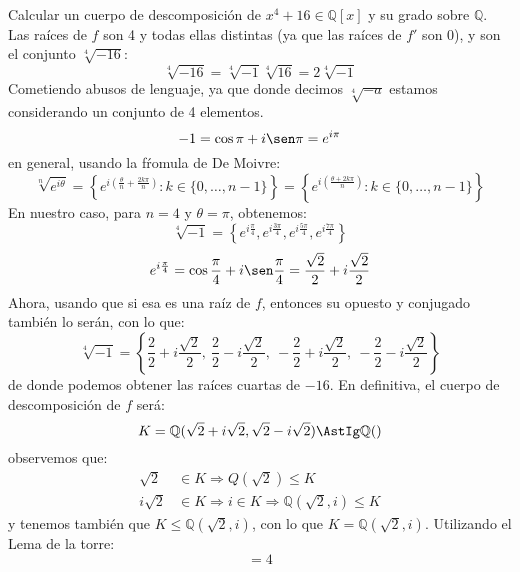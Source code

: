 \begin{ejercicio}
    Calcular un cuerpo de descomposición de $x^4+16\in \mathbb{Q}[x]$ y su grado sobre $\mathbb{Q}$. Las raíces de $f$ son 4 y todas ellas distintas (ya que las raíces de $f'$ son 0), y son el conjunto $\sqrt[4]{-16}$:
    \begin{equation*}
        \sqrt[4]{-16} = \sqrt[4]{-1}\sqrt[4]{16} = 2\sqrt[4]{-1}
    \end{equation*}
    Cometiendo abusos de lenguaje, ya que donde decimos $\sqrt[4]{-a}$ estamos considerando un conjunto de 4 elementos.
    \begin{equation*}
        -1 = \cos\pi + i\sen\pi = e^{i\pi}
    \end{equation*}
    en general, usando la fŕomula de De Moivre:
    \begin{equation*}
        \sqrt[n]{e^{i\theta}} = \left\{e^{i\left(\frac{\theta}{n}+\frac{2k\pi}{n}\right)} : k \in \{0,\ldots,n-1\}\right\} = \left\{e^{i\left(\frac{\theta+2k\pi}{n}\right)} : k \in \{0,\ldots,n-1\}\right\}
    \end{equation*}
    En nuestro caso, para $n=4$ y $\theta = \pi$, obtenemos:
    \begin{equation*}
        \sqrt[4]{-1} = \left\{e^{i\frac{\pi}{4}}, e^{i\frac{3\pi}{4}}, e^{i\frac{5\pi}{4}}, e^{i\frac{7\pi}{4}}\right\}
    \end{equation*}
    \begin{equation*}
        e^{i\frac{\pi}{4}} = \cos\frac{\pi}{4} + i\sen\frac{\pi}{4} = \dfrac{\sqrt{2}}{2}+i\dfrac{\sqrt{2}}{2}
    \end{equation*}
    Ahora, usando que si esa es una raíz de $f$, entonces su opuesto y conjugado también lo serán, con lo que:
    \begin{equation*}
        \sqrt[4]{-1} = \left\{\frac{2}{2}+i\frac{\sqrt{2}}{2},\ \frac{2}{2}-i\frac{\sqrt{2}}{2},\ -\frac{2}{2}+i\frac{\sqrt{2}}{2},\ -\frac{2}{2}-i\frac{\sqrt{2}}{2}\right\}
    \end{equation*}
    de donde podemos obtener las raíces cuartas de $-16$. En definitiva, el cuerpo de descomposición de $f$ será:
    \begin{equation*}
        K = \mathbb{Q}(\sqrt{2}+i\sqrt{2}, \sqrt{2}-i\sqrt{2}) \AstIg \mathbb{Q}()
    \end{equation*}
    observemos que:
    \begin{align*}
        \sqrt{2} &\in  K \Longrightarrow Q(\sqrt{2}) \leq K \\
        i\sqrt{2} &\in K \Longrightarrow i \in K \Longrightarrow \mathbb{Q}(\sqrt{2},i) \leq K
    \end{align*}
    y tenemos también que $K\leq \mathbb{Q}(\sqrt{2},i)$, con lo que $K = \mathbb{Q}(\sqrt{2},i)$. Utilizando el Lema de la torre:
    \begin{equation*}
        [K:\mathbb{Q}] = 4
    \end{equation*}
\end{ejercicio}

